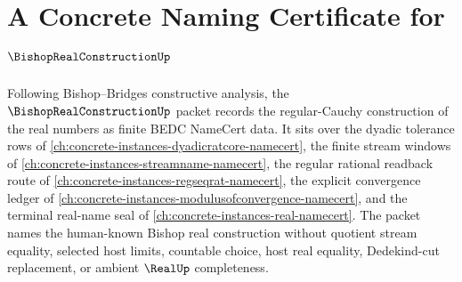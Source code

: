 \chapter{A Concrete Naming Certificate for $\BishopRealConstructionUp$}
\label{ch:concrete-instances-bishop-real-construction-namecert}

Following Bishop--Bridges constructive analysis, the $\BishopRealConstructionUp$ packet records the regular-Cauchy construction of the real numbers as finite BEDC NameCert data. It sits over the dyadic tolerance rows of \autoref{ch:concrete-instances-dyadicratcore-namecert}, the finite stream windows of \autoref{ch:concrete-instances-streamname-namecert}, the regular rational readback route of \autoref{ch:concrete-instances-regseqrat-namecert}, the explicit convergence ledger of \autoref{ch:concrete-instances-modulusofconvergence-namecert}, and the terminal real-name seal of \autoref{ch:concrete-instances-real-namecert}. The packet names the human-known Bishop real construction without quotient stream equality, selected host limits, countable choice, host real equality, Dedekind-cut replacement, or ambient $\RealUp$ completeness.


